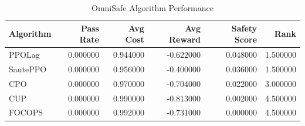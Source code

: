\begin{table}
\caption{OmniSafe Algorithm Performance}
\label{tab:omnisafe_performance}
\begin{tabular}{lrrrrr}
\toprule
Algorithm & Pass Rate & Avg Cost & Avg Reward & Safety Score & Rank \\
\midrule
PPOLag & 0.000000 & 0.944000 & -0.622000 & 0.048000 & 1.500000 \\
SautePPO & 0.000000 & 0.956000 & -0.400000 & 0.036000 & 1.500000 \\
CPO & 0.000000 & 0.970000 & -0.704000 & 0.022000 & 3.000000 \\
CUP & 0.000000 & 0.990000 & -0.813000 & 0.002000 & 4.500000 \\
FOCOPS & 0.000000 & 0.992000 & -0.731000 & 0.000000 & 4.500000 \\
\bottomrule
\end{tabular}
\end{table}
